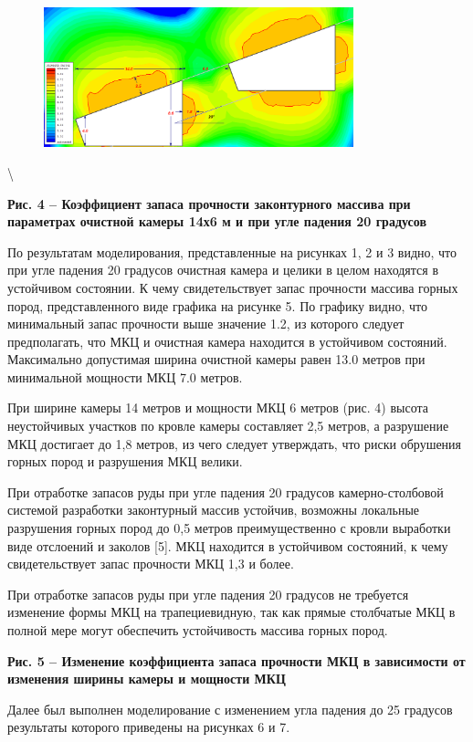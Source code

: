\begin{figure}[H]
	\centering
	\includegraphics[width=0.8\textwidth]{assets/285}
	\caption*{}
\end{figure}\textbackslash{}

{\bfseries Рис. 4 -- Коэффициент запаса прочности законтурного массива при
параметрах очистной камеры 14х6 м и при угле падения 20 градусов}

По результатам моделирования, представленные на рисунках 1, 2 и 3 видно,
что при угле падения 20 градусов очистная камера и целики в целом
находятся в устойчивом состоянии. К чему свидетельствует запас прочности
массива горных пород, представленного виде графика на рисунке 5. По
графику видно, что минимальный запас прочности выше значение 1.2, из
которого следует предполагать, что МКЦ и очистная камера находится в
устойчивом состояний. Максимально допустимая ширина очистной камеры
равен 13.0 метров при минимальной мощности МКЦ 7.0 метров.

При ширине камеры 14 метров и мощности МКЦ 6 метров (рис. 4) высота
неустойчивых участков по кровле камеры составляет 2,5 метров, а
разрушение МКЦ достигает до 1,8 метров, из чего следует утверждать, что
риски обрушения горных пород и разрушения МКЦ велики.

При отработке запасов руды при угле падения 20 градусов
камерно-столбовой системой разработки законтурный массив устойчив,
возможны локальные разрушения горных пород до 0,5 метров преимущественно
с кровли выработки виде отслоений и заколов {[}5{]}. МКЦ находится в
устойчивом состояний, к чему свидетельствует запас прочности МКЦ 1,3 и
более.

При отработке запасов руды при угле падения 20 градусов не требуется
изменение формы МКЦ на трапециевидную, так как прямые столбчатые МКЦ в
полной мере могут обеспечить устойчивость массива горных пород.

{\bfseries Рис. 5 -- Изменение коэффициента запаса прочности МКЦ в
зависимости от изменения ширины камеры и мощности МКЦ}

Далее был выполнен моделирование с изменением угла падения до 25
градусов результаты которого приведены на рисунках 6 и 7.

